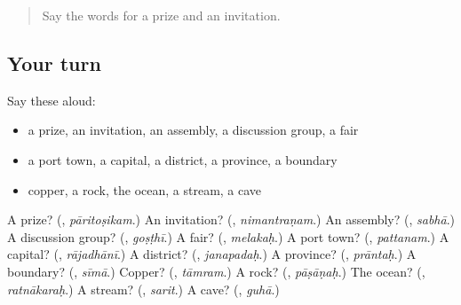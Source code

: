 \label{lesson:SA-R196-second-pass-words-from-chapters-194-196}



\begin{quote}
Say the words for a prize and an invitation.
\end{quote}

\subsection*{Your turn}
Say these aloud:

\begin{itemize}
\raggedright
  \item a prize, an invitation, an assembly, a discussion group, a fair
  \item a port town, a capital, a district, a province, a boundary
  \item copper, a rock, the ocean, a stream, a cave
\end{itemize}

\begin{tcolorbox}[breakable,colback=teal!4,colframe=teal!35!black,title={Before you move on}]
A prize? (\textbf{}, \emph{pāritoṣikam}.) An invitation? (\textbf{}, \emph{nimantraṇam}.) An assembly? (\textbf{}, \emph{sabhā}.) A discussion group? (\textbf{}, \emph{goṣṭhī}.) A fair? (\textbf{}, \emph{melakaḥ}.) A port town? (\textbf{}, \emph{pattanam}.) A capital? (\textbf{}, \emph{rājadhānī}.) A district? (\textbf{}, \emph{janapadaḥ}.) A province? (\textbf{}, \emph{prāntaḥ}.) A boundary? (\textbf{}, \emph{sīmā}.) Copper? (\textbf{}, \emph{tāmram}.) A rock? (\textbf{}, \emph{pāṣāṇaḥ}.) The ocean? (\textbf{}, \emph{ratnākaraḥ}.) A stream? (\textbf{}, \emph{sarit}.) A cave? (\textbf{}, \emph{guhā}.)
\end{tcolorbox}
